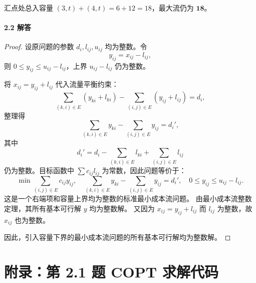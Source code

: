 \documentclass[12pt,a4paper]{article}
\begin{document}
汇点处总入容量 $(3,t)+(4,t)=6+12=18$，最大流仍为 $\mathbf{18}$。

\paragraph{2.2 解答}

\begin{proof}
设原问题的参数 $d_i,l_{ij},u_{ij}$ 均为整数。令
\[
y_{ij} = x_{ij} - l_{ij},
\]
则 $0\le y_{ij}\le u_{ij}-l_{ij}$，上界 $u_{ij}-l_{ij}$ 仍为整数。

将 $x_{ij}=y_{ij}+l_{ij}$ 代入流量平衡约束：
\[
\sum_{(k,i)\in E}(y_{ki}+l_{ki}) - \sum_{(i,j)\in E}(y_{ij}+l_{ij}) = d_i,
\]
整理得
\[
\sum_{(k,i)\in E}y_{ki} - \sum_{(i,j)\in E}y_{ij} = d_i',
\]
其中
\[
d_i' = d_i - \sum_{(k,i)\in E}l_{ki} + \sum_{(i,j)\in E}l_{ij}
\]
仍为整数。目标函数中 $\sum c_{ij}l_{ij}$ 为常数，因此问题等价于：
\[
\min \sum_{(i,j)\in E} c_{ij}y_{ij},\quad
\sum_{(k,i)\in E}y_{ki} - \sum_{(i,j)\in E}y_{ij} = d_i',\quad
0\le y_{ij}\le u_{ij}-l_{ij}.
\]
这是一个右端项和容量上界均为整数的标准最小成本流问题。
由最小成本流整数定理，其所有基本可行解 $y$ 均为整数解。
又因为 $x_{ij}=y_{ij}+l_{ij}$ 而 $l_{ij}$ 为整数，故 $x_{ij}$ 也为整数。

因此，引入容量下界的最小成本流问题的所有基本可行解均为整数解。
\end{proof}

\newpage
\section*{附录：第 2.1 题 COPT 求解代码}
\end{document}
